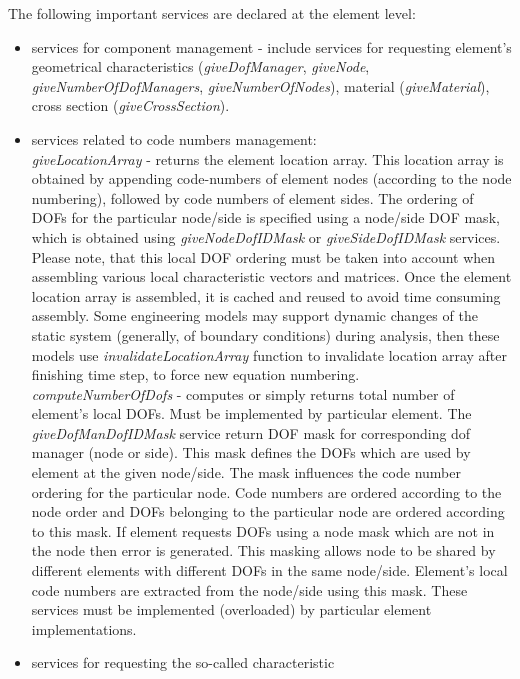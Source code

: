 \documentclass[a4paper]{article}
\newcommand{\service}[1]{{\em #1}}
\begin{document}
The following important services are declared at the element level:
\begin{itemize}
\item services for component management - include services for
requesting element's geometrical characteristics
(\service{giveDofManager}, \service{giveNode},
\service{giveNumberOfDofManagers},
\service{giveNumberOfNodes}), material (\service{giveMaterial}), cross
section (\service{giveCrossSection}).

\item services related to code numbers management:\\
\service{giveLocationArray} - returns the element location array. This
location array is obtained by appending  code-numbers of element
nodes (according to the node numbering), followed by code numbers of
element sides. The ordering of DOFs for the particular node/side is
specified using a node/side DOF mask, which is obtained using
\service{giveNodeDofIDMask} or \service{giveSideDofIDMask} services.
Please note, that this local DOF ordering must be taken into account when assembling various local characteristic 
  vectors and matrices. Once the element location array is assembled,
it is cached and reused to avoid time consuming assembly. 
 Some engineering models
  may support dynamic changes of the static system (generally, of boundary conditions) during analysis,
  then these models use \service{invalidateLocationArray} function to invalidate location array
after finishing time step, to force new equation numbering.\\
\service{computeNumberOfDofs} - computes or simply returns total
number of element's local DOFs. Must be implemented by particular
element. The \service{giveDofManDofIDMask} service return
DOF mask for corresponding dof manager (node or side). This mask defines the DOFs which are used by element 
at the given node/side. The mask influences the code number ordering
for the particular node. Code numbers are 
ordered according to the node order and DOFs belonging to the particular node are ordered 
according to this mask. If element requests DOFs using a node mask
which are not in the node
then error is generated. This masking allows node to be shared by different elements with 
different DOFs in the same node/side. Element's local code numbers are
extracted from the node/side using 
this mask. These services must be implemented (overloaded) by
particular element implementations.
\item
services for requesting the so-called  characteristic

\end{itemize}
\end{document}
